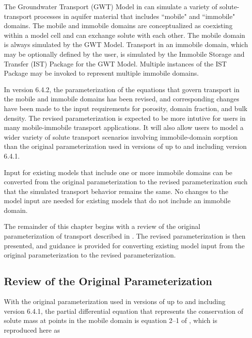 
The Groundwater Transport (GWT) Model \citep{modflow6gwt} in \mf can simulate a variety of solute-transport processes in aquifer material that includes ``mobile" and ``immobile" domains. The mobile and immobile domains are conceptualized as coexisting within a model cell and can exchange solute with each other. The mobile domain is always simulated by the GWT Model.  Transport in an immobile domain, which may be optionally defined by the user, is simulated by the Immobile Storage and Transfer (IST) Package \citep{modflow6gwt} for the GWT Model. Multiple instances of the IST Package may be invoked to represent multiple immobile domains.

In \mf version 6.4.2, the parameterization of the equations that govern transport in the mobile and immobile domains has been revised, and corresponding changes have been made to the input requirements for porosity, domain fraction, and bulk density. The revised parameterization is expected to be more intutive for users in many mobile-immobile transport applications. It will also allow users to model a wider variety of solute transport scenarios involving immobile-domain sorption than the original parameterization used in versions of \mf up to and including version 6.4.1.

Input for existing \mf models that include one or more immobile domains can be converted from the original parameterization to the revised parameterization such that the simulated transport behavior remains the same. No changes to the model input are needed for existing \mf models that do not include an immobile domain.

The remainder of this chapter begins with a review of the original parameterization of transport described in \citep{modflow6gwt}. The revised parameterization is then presented, and guidance is provided for converting existing model input from the original parameterization to the revised parameterization.

\subsection{Review of the Original Parameterization} \label{sec:origparamreview}

With the original parameterization used in versions of \mf up to and including version 6.4.1, the partial differential equation that represents the conservation of solute mass at points in the mobile domain is equation 2--1 of \cite{modflow6gwt}, which is reproduced here as

